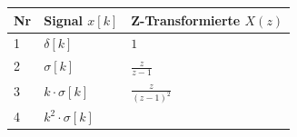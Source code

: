 \documentclass[11pt]{article}
\begin{document}
\begin{longtable}[]{@{}lll@{}}
\toprule
\begin{minipage}[b]{0.05\columnwidth}\raggedright\strut
Nr\strut
\end{minipage} & \begin{minipage}[b]{0.28\columnwidth}\raggedright\strut
Signal \(x[k]\)\strut
\end{minipage} & \begin{minipage}[b]{0.58\columnwidth}\raggedright\strut
Z-Transformierte \(X(z)\)\strut
\end{minipage}\tabularnewline
\midrule
\endhead
\begin{minipage}[t]{0.05\columnwidth}\raggedright\strut
1\strut
\end{minipage} & \begin{minipage}[t]{0.28\columnwidth}\raggedright\strut
\(\delta[k]\)\strut
\end{minipage} & \begin{minipage}[t]{0.58\columnwidth}\raggedright\strut
\(1\)\strut
\end{minipage}\tabularnewline
\begin{minipage}[t]{0.05\columnwidth}\raggedright\strut
2\strut
\end{minipage} & \begin{minipage}[t]{0.28\columnwidth}\raggedright\strut
\(\sigma[k]\)\strut
\end{minipage} & \begin{minipage}[t]{0.58\columnwidth}\raggedright\strut
\(\frac{z}{z-1}\)\strut
\end{minipage}\tabularnewline
\begin{minipage}[t]{0.05\columnwidth}\raggedright\strut
3\strut
\end{minipage} & \begin{minipage}[t]{0.28\columnwidth}\raggedright\strut
\(k \cdot \sigma[k]\)\strut
\end{minipage} & \begin{minipage}[t]{0.58\columnwidth}\raggedright\strut
\(\frac{z}{(z-1)^2}\)\strut
\end{minipage}\tabularnewline
\begin{minipage}[t]{0.05\columnwidth}\raggedright\strut
4\strut
\end{minipage} & \begin{minipage}[t]{0.28\columnwidth}\raggedright\strut
\(k^2 \cdot \sigma[k]\)\strut
\end{minipage} & \begin{minipage}[t]{0.58\columnwidth}\raggedright\strut

\end{minipage}
\end{longtable}
\end{document}
